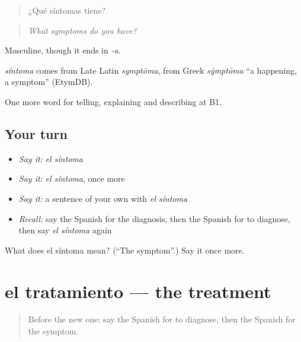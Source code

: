 \begin{quote}
¿Qué síntomas tiene?
\end{quote}

\begin{quote}
\emph{What symptoms do you have?}
\end{quote}

Masculine, though it ends in \emph{-a}.

\begin{cousinweb}
\emph{síntoma} comes from Late Latin \emph{symptōma}, from Greek \emph{sýmptōma} \textquotedblleft{}a happening, a symptom\textquotedblright{} (EtymDB).
\end{cousinweb}

\begin{grammarlens}[title={What you've built}]
One more word for telling, explaining and describing at B1.
\end{grammarlens}

\subsection*{Your turn}
\begin{itemize}
\raggedright
  \item \emph{Say it:} \emph{el síntoma}
  \item \emph{Say it:} \emph{el síntoma}, once more
  \item \emph{Say it:} a sentence of your own with \emph{el síntoma}
  \item \emph{Recall:} say the Spanish for the diagnosis, then the Spanish for to diagnose, then say \emph{el síntoma} again
\end{itemize}

\begin{tcolorbox}[breakable,colback=teal!4,colframe=teal!35!black,title={Before you move on}]
What does el síntoma mean? (\textquotedblleft{}The symptom\textquotedblright{}.) Say it once more.
\end{tcolorbox}
\section[el tratamiento]{el tratamiento — the treatment}

\label{lesson:ES-C738-tratamiento}



\begin{quote}
Before the new one: say the Spanish for to diagnose, then the Spanish for the symptom.
\end{quote}

